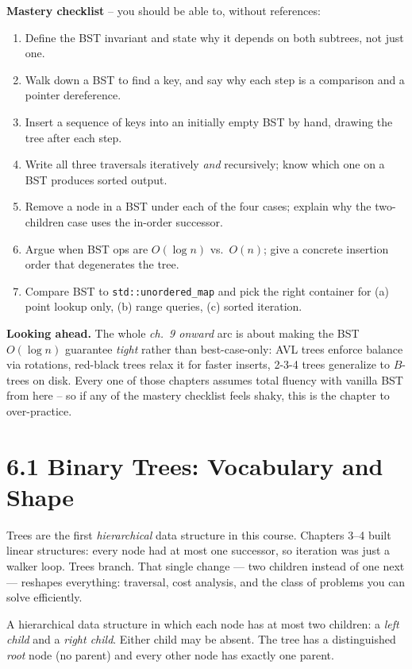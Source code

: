 \documentclass[11pt]{article}
\begin{document}
\begin{ideabox}
\textbf{Mastery checklist} -- you should be able to, without references:
\begin{enumerate}
    \item Define the BST invariant and state why it depends on both
          subtrees, not just one.
    \item Walk down a BST to find a key, and say why each step is a
          comparison and a pointer dereference.
    \item Insert a sequence of keys into an initially empty BST by
          hand, drawing the tree after each step.
    \item Write all three traversals iteratively \emph{and} recursively;
          know which one on a BST produces sorted output.
    \item Remove a node in a BST under each of the four cases; explain
          why the two-children case uses the in-order successor.
    \item Argue when BST ops are $O(\log n)$ vs.\ $O(n)$; give a
          concrete insertion order that degenerates the tree.
    \item Compare BST to \texttt{std::unordered\_map} and pick the right
          container for (a) point lookup only, (b) range queries,
          (c) sorted iteration.
\end{enumerate}

\textbf{Looking ahead.} The whole \emph{ch.~9 onward} arc is about
making the BST $O(\log n)$ guarantee \emph{tight} rather than
best-case-only: AVL trees enforce balance via rotations, red-black trees
relax it for faster inserts, 2-3-4 trees generalize to $B$-trees on disk.
Every one of those chapters assumes total fluency with vanilla BST from
here -- so if any of the mastery checklist feels shaky, this is the
chapter to over-practice.
\end{ideabox}

\section{6.1 Binary Trees: Vocabulary and Shape}

Trees are the first \emph{hierarchical} data structure in this
course. Chapters 3--4 built linear structures: every node had
at most one successor, so iteration was just a walker loop.
Trees branch. That single change --- two children instead of one
next --- reshapes everything: traversal, cost analysis, and the
class of problems you can solve efficiently.

\begin{defnbox}
A hierarchical data structure in which each node has at most two
children: a \emph{left child} and a \emph{right child}. Either
child may be absent. The tree has a distinguished \emph{root}
node (no parent) and every other node has exactly one parent.
\end{defnbox}
\end{document}
